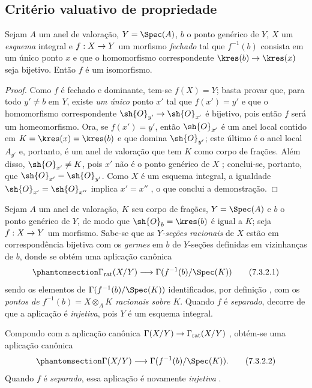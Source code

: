 \documentclass[oneside,10pt]{amsart}
\makeatletter
\newcommand{\ega@arrow}[2]{\mathchoice{#1}{#2}{#2}{#2}}
\renewcommand{\to}{\ega@arrow{\longrightarrow}{\rightarrow}}
\let\EGAOriginalLabel\label
\renewcommand{\label}[1]{\phantomsection\EGAOriginalLabel{#1}}
\makeatother
\begin{document}
\subsection{Critério valuativo de propriedade}
\label{subsection:II.7.3}

\begin{proposition}[7.3.1]
\label{II.7.3.1}
Sejam $A$ um anel de valoração, $Y=\Spec(A)$, $b$ o ponto genérico de $Y$, $X$ um \emph{esquema} integral e $f:X\to Y$ um morfismo \emph{fechado} tal que $f^{-1}(b)$ consista em um único ponto $x$ e que o homomorfismo correspondente $\kres(b)\to\kres(x)$ seja bijetivo.
Então $f$ é um isomorfismo.
\end{proposition}

\begin{proof}
Como $f$ é fechado e dominante, tem-se $f(X)=Y$;
basta  provar que, para todo $y'\neq b$ em $Y$, existe \emph{um único} ponto $x'$ tal que $f(x')=y'$ e que o homomorfismo correspondente $\sh{O}_{y'}\to\sh{O}_{x'}$ é bijetivo, pois então $f$ será um homeomorfismo.
Ora, se $f(x')=y'$, então $\sh{O}_{x'}$ é um anel local contido em $K=\kres(x)=\kres(b)$ e que domina $\sh{O}_{y'}$;
este último é o anel local $A_{y'}$ e, portanto, é um anel de valoração  que tem $K$ como corpo de frações.
Além disso, $\sh{O}_{x'}\neq K$, pois $x'$ não é o ponto genérico de $X$ ;
conclui-se, portanto, que $\sh{O}_{x'}=\sh{O}_{y'}$.
Como $X$ é um esquema integral, a igualdade $\sh{O}_{x'}=\sh{O}_{x''}$ implica $x'=x''$ , o que conclui a demonstração.
\end{proof}

\begin{env}[7.3.2]
\label{II.7.3.2}
Sejam $A$ um anel de valoração, $K$ seu corpo de frações, $Y=\Spec(A)$ e $b$ o ponto genérico de $Y$, de modo que $\sh{O}_b=\kres(b)$ é igual a $K$;
seja $f:X\to Y$ um morfismo.
Sabe-se  que as \emph{$Y$-seções racionais} de $X$ estão em correspondência bijetiva com os \emph{germes} em $b$ de $Y$-seções definidas em vizinhanças de $b$, donde se obtém uma aplicação canônica
\[
\label{II.7.3.2.1}
    \Gamma_\mathrm{rat}(X/Y) \to \Gamma(f^{-1}(b)/\Spec(K))
\tag{7.3.2.1}
\]
sendo os elementos de $\Gamma(f^{-1}(b)/\Spec(K))$ identificados, por definição , com os \emph{pontos de $f^{-1}(b)=X\otimes_A K$ racionais sobre $K$}.
Quando $f$ é \emph{separado}, decorre de  que a aplicação  é \emph{injetiva}, pois $Y$ é um esquema integral.

Compondo  com a aplicação canônica $\Gamma(X/Y)\to\Gamma_\mathrm{rat}(X/Y)$ , obtém-se uma aplicação canônica
\[
\label{II.7.3.2.2}
    \Gamma(X/Y) \to \Gamma(f^{-1}(b)/\Spec(K)).
\tag{7.3.2.2}
\]
Quando $f$ é \emph{separado}, essa aplicação é novamente \emph{injetiva} .
\end{env}
\end{document}
